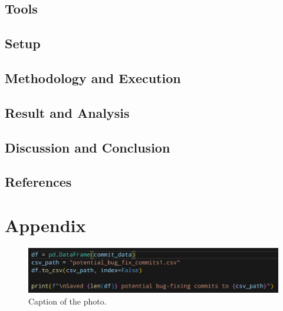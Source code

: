 \documentclass[a4paper,12pt,twoside,english]{all-in-one} %
\begin{document}
\subsection{Tools}
\subsection{Setup}
\subsection{Methodology and Execution}
\subsection{Result and Analysis}
\subsection{Discussion and Conclusion}
\subsection{References}




\newpage
\appendix
\section{Appendix}
\begin{figure}[!ht]
    \centering
    \includegraphics[width=\textwidth]{image.png}
    \caption{Caption of the photo.}
    \label{fig:myimage}
\end{figure}

\clearpage
\pagestyle{\auxsettings}
\printbibliography[heading=bibintoc]
\end{document}

